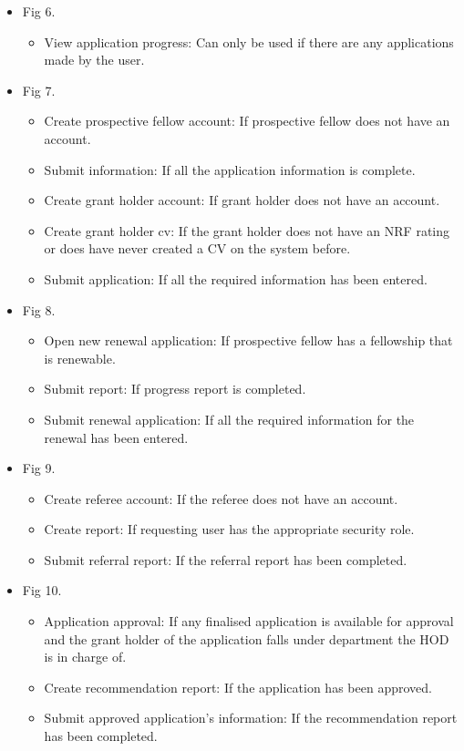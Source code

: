 \documentclass[12pt]{article}
\begin{document}
\begin{itemize}
	\item Fig 6.
		\begin{itemize}
			\item View application progress: Can only be used if there are any applications made by the user.
		\end{itemize}
		
	\item Fig 7.
		\begin{itemize}
			\item Create prospective fellow account: If prospective fellow does not have an account.
			\item Submit information: If all the application information is complete.				
			\item Create grant holder account: If grant holder does not have an account.
			\item Create grant holder cv: If the grant holder does not have an NRF rating or does have never created a CV on the system before.
			\item Submit application: If all the required information has been entered.									
		\end{itemize}
	
	\item Fig 8.
		\begin{itemize}
			\item Open new renewal application: If prospective fellow has a fellowship that is renewable.
			\item Submit report: If progress report is completed.				
			\item Submit renewal application: If all the required information for the renewal has been entered.									
		\end{itemize}
	
	\item Fig 9.
		\begin{itemize}
			\item Create referee account: If the referee does not have an account.
			\item Create report: If requesting user has the appropriate security role.				
			\item Submit referral report: If the referral report has been completed.									
		\end{itemize}
		
	\item Fig 10.
		\begin{itemize}
			\item Application approval: If any finalised application is available for approval and the grant holder of the application falls under department the HOD is in charge of.
			\item Create recommendation report: If the application has been approved.				
			\item Submit approved application's information: If the recommendation report has been completed.									
		\end{itemize}
		

\end{itemize}
\end{document}
